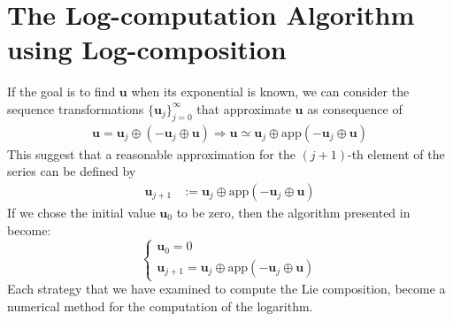 \section{The Log-computation Algorithm using Log-composition}

If the goal is to find $\mathbf{u}$ when its exponential is known, we can consider the sequence transformations $\{\mathbf{u}_{j}  \}_{j=0}^{\infty}$ that approximate $\mathbf{u}$ as consequence of
\begin{align*}
\mathbf{u} = \mathbf{u}_{j} \oplus  (-\mathbf{u}_{j}  \oplus  \mathbf{u} ) \Longrightarrow
\mathbf{u} \simeq \mathbf{u}_{j} \oplus  \text{app}(-\mathbf{u}_{j}  \oplus  \mathbf{u} )
\end{align*}
This suggest that a reasonable approximation for the $(j+1)$-th element of the series can be defined by
\begin{align*}
\mathbf{u}_{j+1} & :=  \mathbf{u}_{j} \oplus  \text{app}(-\mathbf{u}_{j}  \oplus  \mathbf{u} )
\end{align*}
If we chose the initial value $\mathbf{u}_{0}$ to be zero, then the algorithm presented in \cite{Bossa:08}  become:
\begin{equation}\label{eq:bossa_reformulated}
\begin{cases}
\mathbf{u}_0 = 0 \\
\mathbf{u}_{j+1} = \mathbf{u}_{j} \oplus  \text{app}(-\mathbf{u}_{j}  \oplus  \mathbf{u} )
\end{cases}
\end{equation}
Each strategy that we have examined to compute the Lie composition, become a numerical method for the computation of the logarithm.
